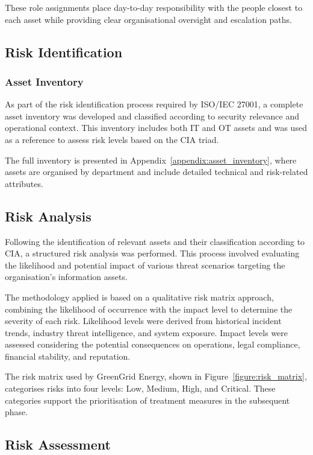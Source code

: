 These role assignments place day-to-day responsibility with the people closest
to each asset while providing clear organisational oversight and escalation
paths.


\subsection{Risk Identification}

\subsubsection{Asset Inventory}

As part of the risk identification process required by ISO/IEC 27001, a complete asset inventory was developed and classified according to security relevance and operational context. This inventory includes both \ac{IT} and \ac{OT} assets and was used as a reference to assess risk levels based on the \ac{CIA} triad.

The full inventory is presented in Appendix~\ref{appendix:asset_inventory}, where assets are organised by department and include detailed technical and risk-related attributes.

\subsection{Risk Analysis}

Following the identification of relevant assets and their classification according to \ac{CIA}, a structured risk analysis was performed. This process involved evaluating the likelihood and potential impact of various threat scenarios targeting the organisation’s information assets.

The methodology applied is based on a qualitative risk matrix approach, combining the likelihood of occurrence with the impact level to determine the severity of each risk. Likelihood levels were derived from historical incident trends, industry threat intelligence, and system exposure. Impact levels were assessed considering the potential consequences on operations, legal compliance, financial stability, and reputation.

The risk matrix used by GreenGrid Energy, shown in Figure~\ref{figure:risk_matrix}, categorises risks into four levels: Low, Medium, High, and Critical. These categories support the prioritisation of treatment measures in the subsequent phase.

\subsection{Risk Assessment}

